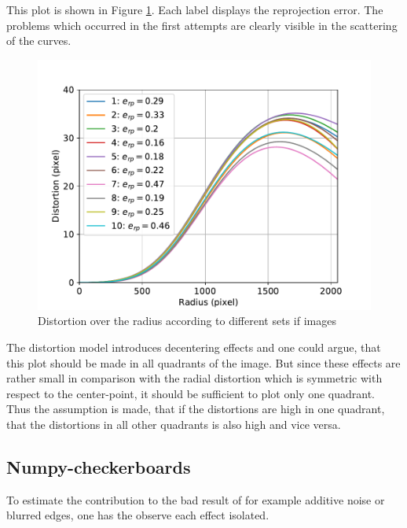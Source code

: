 This plot is shown in Figure \ref{development:stat}.
Each label displays the reprojection error.
The problems which occurred in the first attempts are clearly visible in the scattering of the curves.
\begin{figure}[ht]
	\centering
	\includegraphics[width=0.9\linewidth]{3-development/calibration/images/stat.pdf}
	\caption{Distortion over the radius according to different sets if images\label{development:stat}}
\end{figure}
The distortion model introduces decentering effects and one could argue, that this plot should be made in all quadrants of the image.
But since these effects are rather small in comparison with the radial distortion which is symmetric with respect to the center-point, it should be sufficient to plot only one quadrant.
Thus the assumption is made, that if the distortions are high in one quadrant, that the distortions in all other quadrants is also high and vice versa.

\subsection{Numpy-checkerboards\label{development:checker}}  
To estimate the contribution to the bad result of for example additive noise or blurred edges, one has the observe each effect isolated.

